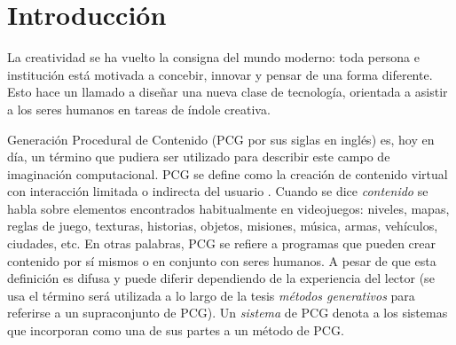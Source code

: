 \chapter*{Introducción}\label{chapter:introduction}




La creatividad se ha vuelto la consigna del mundo moderno: toda persona e institución
está motivada a concebir, innovar y pensar de una forma diferente. 
Esto hace un llamado a diseñar una nueva clase de tecnología, orientada a
asistir a los seres humanos en tareas de índole creativa.

Generación Procedural de Contenido (PCG por sus siglas en inglés)
es, hoy en día, un término que pudiera ser utilizado para describir este campo de imaginación
computacional. PCG se define como la creación de contenido virtual con interacción
limitada o indirecta del usuario \cite{bib:5}. Cuando se dice \textit{contenido} se habla
sobre elementos encontrados habitualmente en videojuegos: niveles, mapas,
reglas de juego, texturas, historias, objetos, misiones, música,
armas, vehículos, ciudades, etc. En otras palabras, PCG se refiere
a programas que pueden crear contenido por sí mismos
o en conjunto con seres humanos. A pesar de que esta definición
es difusa y puede diferir dependiendo de la experiencia
del lector (se usa el término será utilizada a lo largo de la
tesis \textit{métodos generativos} para
referirse a un supraconjunto de PCG). Un \textit{sistema} de PCG 
denota a los sistemas que incorporan como una de sus partes a un método de PCG.

